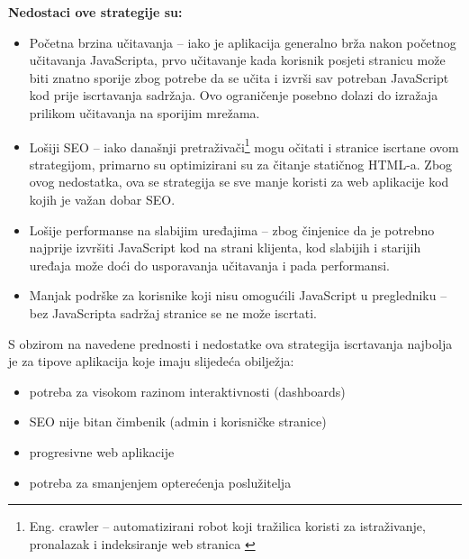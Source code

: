 \bigskip

\textbf{Nedostaci ove strategije su:}

\begin{itemize}
    \item Početna brzina učitavanja – iako je aplikacija generalno brža nakon početnog učitavanja JavaScripta, prvo učitavanje kada korisnik posjeti stranicu može biti znatno sporije zbog potrebe da se učita i izvrši sav potreban JavaScript kod prije iscrtavanja sadržaja. Ovo ograničenje posebno dolazi do izražaja prilikom učitavanja na sporijim mrežama.
    \item Lošiji SEO – iako današnji pretraživači\footnote{Eng. crawler – automatizirani robot koji tražilica koristi za istraživanje, pronalazak i indeksiranje web stranica \cite{googlesearch}} mogu očitati i stranice iscrtane ovom strategijom, primarno su optimizirani su za čitanje statičnog HTML-a. Zbog ovog nedostatka, ova se strategija se sve manje koristi za web aplikacije kod kojih je važan dobar SEO.
    \item Lošije performanse na slabijim uređajima – zbog činjenice da je potrebno najprije izvršiti JavaScript kod na strani klijenta, kod slabijih i starijih uređaja može doći do usporavanja učitavanja i pada performansi.
    \item Manjak podrške za korisnike koji nisu omogućili JavaScript u pregledniku – bez JavaScripta sadržaj stranice se ne može iscrtati.
\end{itemize}

S obzirom na navedene prednosti i nedostatke ova strategija iscrtavanja najbolja je za tipove aplikacija koje imaju slijedeća obilježja:
\begin{itemize}
    \item potreba za visokom razinom interaktivnosti (dashboards)
    \item SEO nije bitan čimbenik (admin i korisničke stranice)
    \item progresivne web aplikacije
    \item potreba za smanjenjem opterećenja poslužitelja
\end{itemize}

